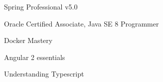 

\begin{cvparagraph}

\vspace{10pt}
\begin{cvitems} %
        \item {Spring Professional v5.0}
        \item {Oracle Certified Associate, Java SE 8 Programmer}
        \item {Docker Mastery}
        \item {Angular 2 essentials}
        \item {Understanding Typescript}
      \end{cvitems}
\end{cvparagraph}
